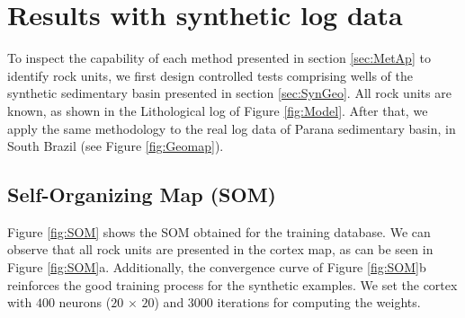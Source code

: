 \documentclass[preprint,12pt]{elsarticle}
\begin{document}
\section{Results with synthetic log data}
\label{sec:Res}
To inspect the capability of each method presented in section \ref{sec:MetAp} to identify rock units, we first design controlled tests comprising wells of the synthetic sedimentary basin presented in section \ref{sec:SynGeo}. All rock units are known, as shown in the Lithological log of Figure \ref{fig:Model}. After that, we apply the same methodology to the real log data of Parana sedimentary basin, in South Brazil (see Figure \ref{fig:Geomap}). 


\subsection{Self-Organizing Map (SOM)}
Figure \ref{fig:SOM} shows the SOM obtained for the training database. We can observe that all rock units are presented in the cortex map, as can be seen in Figure \ref{fig:SOM}a. Additionally, the convergence curve of Figure \ref{fig:SOM}b reinforces the good training process for the synthetic examples. We set the cortex with $400$ neurons ($20$ $\times$ $20$) and $3000$ iterations for computing the weights. 
\end{document}

